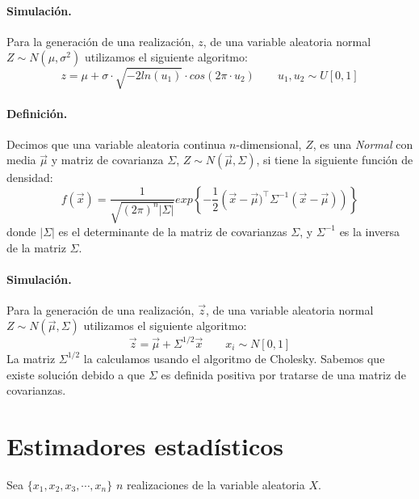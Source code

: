 \paragraph{Simulaci\'on.} Para la generaci\'on de una realizaci\'on, $z$, de 
una variable aleatoria normal $Z \sim N(\mu, \sigma^2)$ utilizamos el siguiente 
algoritmo:
\begin{displaymath}
z = \mu + \sigma\cdot \sqrt{-2 ln(u_1)} \cdot cos(2 \pi \cdot u_2)
\qquad u_1, u_2 \sim U[0,1]
\end{displaymath}

\paragraph{Definici\'on.} Decimos que una variable aleatoria continua 
$n$-dimensional, $Z$, es una \emph{Normal} con media $\vec{\mu}$
y matriz de covarianza $\Sigma$, $Z \sim N(\vec{\mu}, \Sigma)$, si tiene la
siguiente funci\'on de densidad:
\begin{displaymath}
f(\vec{x}) = \frac{1}{\sqrt{(2 \pi)^n \left| \Sigma \right|}}
exp\left\{-\frac{1}{2}\left(\vec{x}-\vec{\mu})^{\top} \Sigma^{-1} (\vec{x}-\vec{\mu}) \right)\right\}
\end{displaymath}
donde $\left|\Sigma\right|$ es el determinante de la matriz de covarianzas 
$\Sigma$, y $\Sigma^{-1}$ es la inversa de la matriz $\Sigma$.

\paragraph{Simulaci\'on.} Para la generaci\'on de una realizaci\'on, $\vec{z}$, 
de una variable aleatoria normal $Z \sim N(\vec{\mu}, \Sigma)$ utilizamos el 
siguiente algoritmo:
\begin{displaymath}
\vec{z} = \vec{\mu} + \Sigma^{1/2} \vec{x}
\qquad x_i \sim N[0,1]
\end{displaymath}
La matriz $\Sigma^{1/2}$ la calculamos usando el algoritmo de Cholesky. Sabemos 
que existe soluci\'on debido a que $\Sigma$ es definida positiva por tratarse
de una matriz de covarianzas.


\section{Estimadores estad\'isticos}
\label{apendix:estim}

Sea $\{x_1,x_2,x_3,\cdots,x_n\}$ $n$ realizaciones de la variable aleatoria
$X$.

